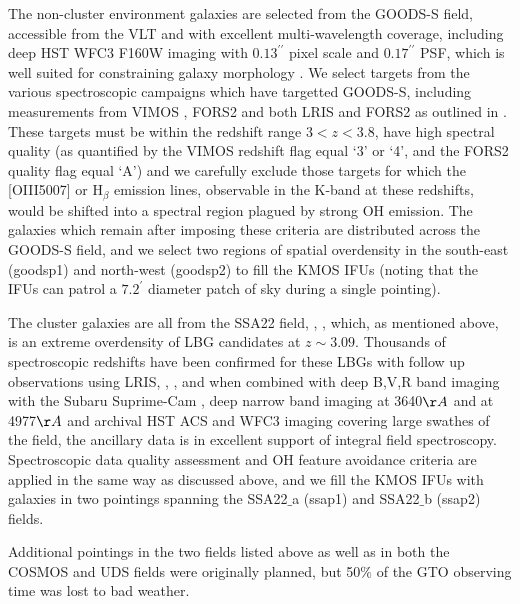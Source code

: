 \documentclass[a4paper,fleqn,usenatbib]{mn2e}
\begin{document}
The non-cluster environment galaxies are selected from the GOODS-S field, accessible from the VLT and with excellent multi-wavelength coverage, including deep HST WFC3 F160W imaging with $ 0.13^{\prime\prime}$ pixel scale and $ 0.17^{\prime\prime}$ PSF, which is well suited for constraining galaxy morphology \citep{Grogin2011,Koekemoer2011}.
We select targets from the various spectroscopic campaigns which have targetted GOODS-S, including measurements from VIMOS \citep{Balestra2010,Cassata2014}, FORS2 \citep{Vanzella2005,Vanzella2006,Vanzella2008} and both LRIS and FORS2 as outlined in \cite{Wuyts2009}.
These targets must be within the redshift range $3 < z < 3.8$, have high spectral quality (as quantified by the VIMOS redshift flag equal `3' or `4', and the FORS2 quality flag equal `A') and we carefully exclude those targets for which the [OIII5007] or H$_{\beta}$ emission lines, observable in the K-band at these redshifts, would be shifted into a spectral region plagued by strong OH emission.
The galaxies which remain after imposing these criteria are distributed across the GOODS-S field, and we select two regions of spatial overdensity in the south-east (goodsp1) and north-west (goodsp2) to fill the KMOS IFUs (noting that the IFUs can patrol a $7.2^{\prime}$ diameter patch of sky during a single pointing).

The cluster galaxies are all from the SSA22 field, \citep{Steidel1998,Steidel2000,Steidel2003}, \citep{Shapley2003}, which, as mentioned above, is an extreme overdensity of LBG candidates at $z \sim 3.09$.
Thousands of spectroscopic redshifts have been confirmed for these LBGs with follow up observations using LRIS, \citep{Shapley2003}, \citep{Nestor2013}, and when combined with deep B,V,R band imaging with the Subaru Suprime-Cam \citep{Matsuda2004}, deep narrow band imaging at 3640$\AA$ \citep{Matsuda2004} and at 4977$\AA$ \citep{Nestor2011} and archival HST ACS and WFC3 imaging covering large swathes of the field, the ancillary data is in excellent support of integral field spectroscopy.
Spectroscopic data quality assessment and OH feature avoidance criteria are applied in the same way as discussed above, and we fill the KMOS IFUs with galaxies in two pointings spanning the SSA22$\_$a (ssap1) and SSA22$\_$b (ssap2) fields.


Additional pointings in the two fields listed above as well as in both the COSMOS and UDS fields were originally planned, but 50$\%$ of the GTO observing time was lost to bad weather.
\end{document}
